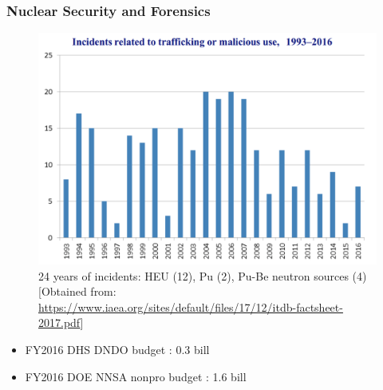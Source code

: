 \begin{frame}
  \frametitle{Nuclear Security and Forensics}
  \begin{minipage}{0.6\textwidth}
    \begin{figure}
      \centering
      \includegraphics[width=\textwidth]{./figures/nucleartrafficking.png}
      \caption{24 years of incidents: HEU (12), Pu (2), Pu-Be neutron sources (4)
               \tiny [Obtained from:
               \url{https://www.iaea.org/sites/default/files/17/12/itdb-factsheet-2017.pdf}]}
    \end{figure}
  \end{minipage}%
  \begin{minipage}{0.4\textwidth}
    \begin{itemize}
      \item FY2016 DHS DNDO budget : 0.3 bill
      \item FY2016 DOE NNSA nonpro budget : 1.6 bill
    \end{itemize}
  \end{minipage}
\end{frame}

